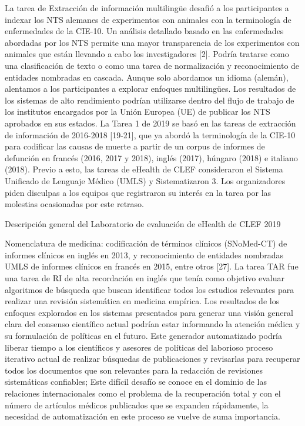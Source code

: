 La tarea de Extracción de información multilingüe desafió a los participantes a indexar los NTS alemanes de experimentos con animales con la terminología de enfermedades de la CIE-10. Un análisis detallado basado en las enfermedades abordadas por los NTS permite una mayor transparencia de los experimentos con animales que están llevando a cabo los investigadores [2]. Podría tratarse como una clasificación de texto o como una tarea de normalización y reconocimiento de entidades nombradas en cascada. Aunque solo abordamos un idioma (alemán), alentamos a los participantes a explorar enfoques multilingües. Los resultados de los sistemas de alto rendimiento podrían utilizarse dentro del flujo de trabajo de los institutos encargados por la Unión Europea (UE) de publicar los NTS aprobados en sus estados. La Tarea 1 de 2019 se basó en las tareas de extracción de información de 2016-2018 [19-21], que ya abordó la terminología de la CIE-10 para codificar las causas de muerte a partir de un corpus de informes de defunción en francés (2016, 2017 y 2018), inglés (2017), húngaro (2018) e italiano (2018). Previo a esto, las tareas de eHealth de CLEF consideraron el Sistema Unificado de Lenguaje Médico (UMLS) y Sistematizaron 3. Los organizadores piden disculpas a los equipos que registraron su interés en la tarea por las molestias ocasionadas por este retraso.

Descripción general del Laboratorio de evaluación de eHealth de CLEF 2019

Nomenclatura de medicina: codificación de términos clínicos (SNoMed-CT) de informes clínicos en inglés en 2013, y reconocimiento de entidades nombradas UMLS de informes clínicos en francés en 2015, entre otros [27]. La tarea TAR fue una tarea de RI de alta recordación en inglés que tenía como objetivo evaluar algoritmos de búsqueda que buscan identificar todos los estudios relevantes para realizar una revisión sistemática en medicina empírica. Los resultados de los enfoques explorados en los sistemas presentados para generar una visión general clara del consenso científico actual podrían estar informando la atención médica y su formulación de políticas en el futuro. Este generador automatizado podría liberar tiempo a los científicos y asesores de políticas del laborioso proceso iterativo actual de realizar búsquedas de publicaciones y revisarlas para recuperar todos los documentos que son relevantes para la redacción de revisiones sistemáticas confiables; Este difícil desafío se conoce en el dominio de las relaciones internacionales como el problema de la recuperación total y con el número de artículos médicos publicados que se expanden rápidamente, la necesidad de automatización en este proceso se vuelve de suma importancia.

